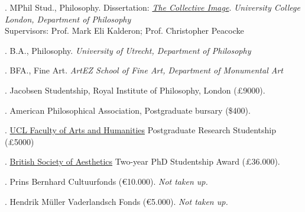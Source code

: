 \documentclass[12pt]{article}
\begin{document}
. MPhil Stud., Philosophy. Dissertation: \href{http://discovery.ucl.ac.uk/1348204/}{\emph{The Collective Image}}. \emph{University College London, Department of  Philosophy \vspace{0.01in}}\\ Supervisors: Prof. Mark Eli Kalderon; Prof. Christopher Peacocke \vspace{-0.1in}

\bigskip

. B.A., Philosophy. \emph{University of Utrecht, Department of  Philosophy\vspace{0.02in}}

\medskip

. BFA., Fine Art. \emph{ArtEZ School of Fine Art, Department of Monumental Art\vspace{0.02in}}

\bigskip

%
%
% 
% 
% 



\medskip

. Jacobsen Studentship, Royal Institute of Philosophy, London (£9000).

. American Philosophical Association, Postgraduate bursary (\$400).

. \href{http://www.ucl.ac.uk/ah/figs/homepage}{UCL Faculty of Arts and Humanities} Postgraduate Research Studentship (£5000) %

. \href{http://www.british-aesthetics.org}{British Society of Aesthetics} Two-year PhD Studentship Award (£36.000).

. Prins Bernhard Cultuurfonds (€10.000). \emph{Not taken up.}

. Hendrik Müller Vaderlandsch Fonds (€5.000). \emph{Not taken up.} 
\end{document}
